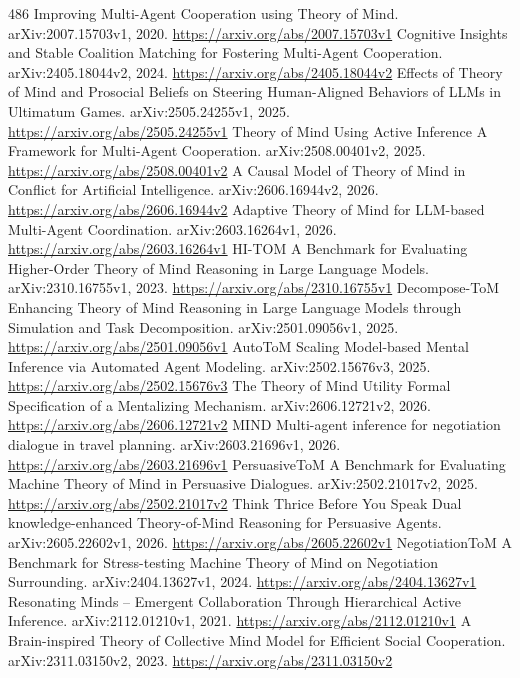 \documentclass[11pt]{article}
\begin{document}
\begin{thebibliography}{486}
 Improving Multi-Agent Cooperation using Theory of Mind. arXiv:2007.15703v1, 2020. \url{https://arxiv.org/abs/2007.15703v1}
 Cognitive Insights and Stable Coalition Matching for Fostering Multi-Agent Cooperation. arXiv:2405.18044v2, 2024. \url{https://arxiv.org/abs/2405.18044v2}
 Effects of Theory of Mind and Prosocial Beliefs on Steering Human-Aligned Behaviors of LLMs in Ultimatum Games. arXiv:2505.24255v1, 2025. \url{https://arxiv.org/abs/2505.24255v1}
 Theory of Mind Using Active Inference A Framework for Multi-Agent Cooperation. arXiv:2508.00401v2, 2025. \url{https://arxiv.org/abs/2508.00401v2}
 A Causal Model of Theory of Mind in Conflict for Artificial Intelligence. arXiv:2606.16944v2, 2026. \url{https://arxiv.org/abs/2606.16944v2}
 Adaptive Theory of Mind for LLM-based Multi-Agent Coordination. arXiv:2603.16264v1, 2026. \url{https://arxiv.org/abs/2603.16264v1}
 HI-TOM A Benchmark for Evaluating Higher-Order Theory of Mind Reasoning in Large Language Models. arXiv:2310.16755v1, 2023. \url{https://arxiv.org/abs/2310.16755v1}
 Decompose-ToM Enhancing Theory of Mind Reasoning in Large Language Models through Simulation and Task Decomposition. arXiv:2501.09056v1, 2025. \url{https://arxiv.org/abs/2501.09056v1}
 AutoToM Scaling Model-based Mental Inference via Automated Agent Modeling. arXiv:2502.15676v3, 2025. \url{https://arxiv.org/abs/2502.15676v3}
 The Theory of Mind Utility Formal Specification of a Mentalizing Mechanism. arXiv:2606.12721v2, 2026. \url{https://arxiv.org/abs/2606.12721v2}
 MIND Multi-agent inference for negotiation dialogue in travel planning. arXiv:2603.21696v1, 2026. \url{https://arxiv.org/abs/2603.21696v1}
 PersuasiveToM A Benchmark for Evaluating Machine Theory of Mind in Persuasive Dialogues. arXiv:2502.21017v2, 2025. \url{https://arxiv.org/abs/2502.21017v2}
 Think Thrice Before You Speak Dual knowledge-enhanced Theory-of-Mind Reasoning for Persuasive Agents. arXiv:2605.22602v1, 2026. \url{https://arxiv.org/abs/2605.22602v1}
 NegotiationToM A Benchmark for Stress-testing Machine Theory of Mind on Negotiation Surrounding. arXiv:2404.13627v1, 2024. \url{https://arxiv.org/abs/2404.13627v1}
 Resonating Minds -- Emergent Collaboration Through Hierarchical Active Inference. arXiv:2112.01210v1, 2021. \url{https://arxiv.org/abs/2112.01210v1}
 A Brain-inspired Theory of Collective Mind Model for Efficient Social Cooperation. arXiv:2311.03150v2, 2023. \url{https://arxiv.org/abs/2311.03150v2}

\end{thebibliography}
\end{document}
